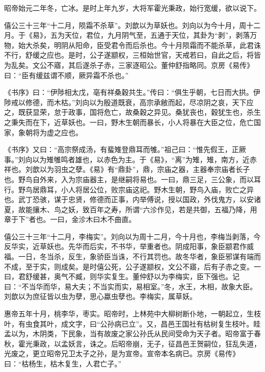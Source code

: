 \documentclass[12pt,UTF8]{ctexbook}
\begin{document}
昭帝始元二年冬，亡冰。是时上年九岁，大将军霍光秉政，始行宽缓，欲以说下。



僖公三十三年“十二月，陨霜不杀草”。刘歆以为草妖也。刘向以为今十月，周十二月。于《易》，五为天位，君位，九月阴气至，五通于天位，其卦为“剥”，剥落万物，始大杀矣，明阴从阳命，臣受君令而后杀也。今十月陨霜而不能杀草，此君诛不行，舒缓之应也。是时，公子遂颛权，三桓始世官，天戒若曰，自此之后，将皆为乱矣。文公不寤，其后遂杀子赤，三家逐昭公。董仲舒指略同。京房《易传》曰：“臣有缓兹谓不顺，厥异霜不杀也。”



《书序》曰：“伊陟相太戊，亳有祥桑穀共生。”传曰：“俱生乎朝，七日而大拱。伊陟戒以修德，而木枯。”刘向以为殷道既衰，高宗承敝而起，尽凉阴之哀，天下应之，既获显荣，怠于政事，国将危亡，故桑穀之异见。桑犹丧也，穀犹生也，杀生之秉失而在下，近草妖也。一曰，野木生朝而暴长，小人将暴在大臣之位，危亡国家，象朝将为虚之应也。



《书序》又曰：“高宗祭成汤，有蜚雉登鼎耳而雊。”祖己曰：“惟先假王，正厥事。”刘向以为雉雊鸣者雄也，以赤色为主。于《易》，“离”为雉，雉，南方，近赤祥也。刘歆以为羽虫之孽。《易》有“鼎卦”，鼎，宗庙之器，主器奉宗庙者长子也。野鸟自外来，入为宗庙器主，是继嗣将易也。一曰，鼎三足，三公象，而以耳行。野鸟居鼎耳，小人将居公位，败宗庙这祀。野木生朝，野鸟入庙，败亡之异也。武丁恐骇，谋于忠贤，修德而正事，内举傅说，授以国政，外伐鬼方，以安诸夏，故能攘木、鸟之妖，致百年之寿，所谓“六沴作见，若是共御，五福乃降，用章于下”者也。一曰，金沴木曰木不曲直。



僖公三十三年“十二月，李梅实”。刘向以为周十二月，今十月也，李梅当剥落，今反华实，近草妖也。先华而后实，不书华，举重者也。阴成阳事，象臣颛君作威福。一日，冬当杀，反生，象骄臣当诛，不行其罚也。故冬华者，象臣邪谋有端而不成，至于实，则成矣。是时僖公死，公子遂颛权，文公不寤，后有子赤之变。一曰，君舒缓甚，奥气不臧，则华实复生。董仲舒以为李梅实，臣下强也。记曰：“不当华而华，易大夫；不当实而实，易相室。”冬，水王，木相，故象大臣。刘歆以为庶征皆以虫为孽，思心蠃虫孽也。李梅实，属草妖。



惠帝五年十月，桃李华，枣实。昭帝时，上林苑中大柳树断仆地，一朝起立，生枝叶，有虫食其叶，成文字，曰“公孙病已立”。又，昌邑王国社有枯树复生枝叶。眭孟以为，木阴类，下民象，当有故废之家公孙氏从民间受命为天子者。昭帝富于春秋，霍光秉政，以孟妖言，诛之。后昭帝崩，无子，征昌邑王贺嗣位，狂乱失道，光废之，更立昭帝兄卫太子之孙，是为宣帝。宣帝本名病已。京房《易传》曰：“枯杨生，枯木复生，人君亡子。”
\end{document}
